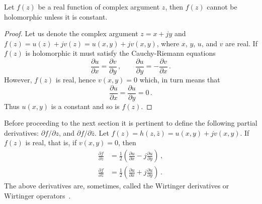 \begin{lem}
  \label{lem:nondiffer}
  Let $f(z)$ be a real function of complex argument $z$, then
  $f(z)$ cannot be holomorphic unless it is constant.
\end{lem}
\begin{proof}[Proof]
  Let us denote the complex argument $z=x+jy$ and $f(z) =
  u(z)+jv(z) = u(x,y) + jv(x,y)$, where $x$, $y$, $u$, and $v$ are
  real. If $f(z)$ is holomorphic it must satisfy the
  Cauchy-Riemann equations
  \begin{equation}
    \label{eq:math-1111}
    \frac{\partial u}{\partial x} = \frac{\partial v}{\partial y}\,,\qquad
    \frac{\partial u}{\partial y} = -\frac{\partial v}{\partial x}\,. 
  \end{equation}
  However, $f(z)$ is real, hence $v(x,y) = 0$ which, in
  turn means that
  \begin{equation}
    \label{eq:math-2222}
    \frac{\partial u}{\partial x} = \frac{\partial u}{\partial y} = 0
    \,. 
  \end{equation}
  Thus $u(x,y)$ is a constant and so is $f(z)$.
\end{proof}
Before proceeding to the next section it is pertinent to define the
following partial derivatives: $\partial f/\partial z$, and  $\partial
f/\partial \bar{z}$. Let $f(z) = h(z, \bar{z}) = u(x,y) + jv(x,y)$. If
$f(z)$ is real, that is, if $v(x,y) = 0$, then
\begin{equation}
  \label{eq:61}
  \begin{split}
    \frac{\partial f}{\partial z} & = \frac{1}{2}
    \left(
      \frac{\partial u}{\partial x} - j\frac{\partial u}{\partial y}
    \right)\,, \\
    \frac{\partial f}{\partial \bar z} & = \frac{1}{2}
    \left(
      \frac{\partial u}{\partial x} + j\frac{\partial u}{\partial y}
    \right) \,.  
  \end{split} 
\end{equation}
The above derivatives are, sometimes, called the Wirtinger derivatives
or Wirtinger operators~.

